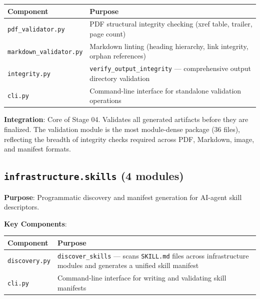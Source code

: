 \documentclass[
]{article}
\newcounter{none} %
\begin{document}
{\def\LTcaptype{none} %
\begin{longtable}[]{@{}
  >{\raggedright\arraybackslash}p{}
  >{\raggedright\arraybackslash}p{}@{}}
\toprule\noalign{}
\begin{minipage}[b]{\linewidth}\raggedright
Component
\end{minipage} & \begin{minipage}[b]{\linewidth}\raggedright
Purpose
\end{minipage} \\
\midrule\noalign{}
\endhead
\bottomrule\noalign{}
\endlastfoot
\texttt{pdf\_validator.py} & PDF structural integrity checking (xref
table, trailer, page count) \\
\texttt{markdown\_validator.py} & Markdown linting (heading hierarchy,
link integrity, orphan references) \\
\texttt{integrity.py} & \texttt{verify\_output\_integrity} ---
comprehensive output directory validation \\
\texttt{cli.py} & Command-line interface for standalone validation
operations \\
\end{longtable}
}

\textbf{Integration}: Core of Stage 04. Validates all generated
artifacts before they are finalized. The validation module is the most
module-dense package (36 files), reflecting the breadth of integrity
checks required across PDF, Markdown, image, and manifest formats.

\subsection{\texorpdfstring{\texttt{infrastructure.skills} (4
modules)}{infrastructure.skills (4 modules)}}\label{infrastructure.skills-4-modules}

\textbf{Purpose}: Programmatic discovery and manifest generation for
AI-agent skill descriptors.

\textbf{Key Components}:

{\def\LTcaptype{none} %
\begin{longtable}[]{@{}
  >{\raggedright\arraybackslash}p{}
  >{\raggedright\arraybackslash}p{}@{}}
\toprule\noalign{}
\begin{minipage}[b]{\linewidth}\raggedright
Component
\end{minipage} & \begin{minipage}[b]{\linewidth}\raggedright
Purpose
\end{minipage} \\
\midrule\noalign{}
\endhead
\bottomrule\noalign{}
\endlastfoot
\texttt{discovery.py} & \texttt{discover\_skills} --- scans
\texttt{SKILL.md} files across infrastructure modules and generates a
unified skill manifest \\
\texttt{cli.py} & Command-line interface for writing and validating
skill manifests \\
\end{longtable}
}
\end{document}
